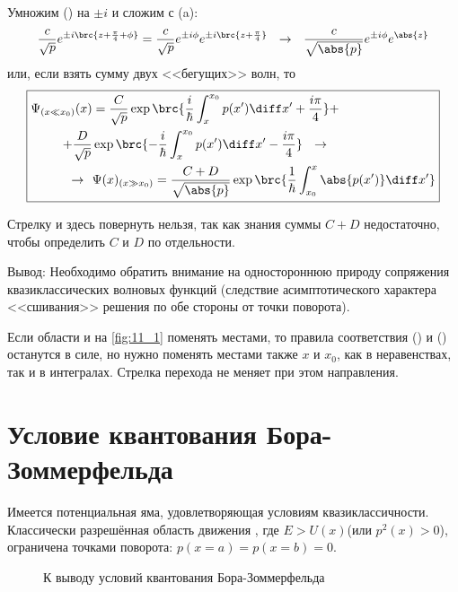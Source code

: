 Умножим () на $\pm i$ и сложим с (a):
$$
\frac{c}{\sqrt{p}} e^{\pm i\brc{z+\frac{\pi}{4}+\phi}} = \frac{c}{\sqrt{p}} e^{\pm i \phi} e^{\pm i\brc{z+\frac{\pi}{4}}} ~~\rightarrow~~
\frac{c}{\sqrt{\abs{p}}} e^{\pm i \phi} e^{\abs{z}}
$$
или, если взять сумму двух <<бегущих>> волн, то
$$
\boxed{
\begin{aligned}
	\Psi_{(x \ll x_0)}(x) &= \frac{C}{\sqrt{p}} \exp\brc{\frac{i}{\hbar} \int_{x}^{x_0} p(x') \diff x' + \frac{i\pi}{4}} 
	+ \\
	+ \frac{D}{\sqrt{p}} &\exp\brc{-\frac{i}{\hbar} \int_{x}^{x_0} p(x') \diff x' - \frac{i\pi}{4}} ~~\rightarrow~~ \\
	~~\rightarrow~~ &\Psi(x)_{(x \gg x_0)} = \frac{C+D}{\sqrt{\abs{p}}} \exp\brc{\frac{1}{\hbar} \int_{x_0}^{x} \abs{p(x')} \diff x'}
\end{aligned}
}
$$

Стрелку и здесь повернуть нельзя, так как знания суммы $C+D$ недостаточно, чтобы определить $C$ и $D$ по отдельности.

Вывод: Необходимо обратить внимание на одностороннюю природу сопряжения квазиклассических волновых функций (следствие асимптотического характера <<сшивания>> решения по обе стороны от точки поворота).

Если области  и  на \autoref{fig:11_1} поменять местами, то правила соответствия () и () останутся в силе, но нужно поменять местами также $x$ и $x_0$, как в неравенствах, так и в интегралах. Стрелка перехода не меняет при этом направления.

\section{Условие квантования Бора-Зоммерфельда}

Имеется потенциальная яма, удовлетворяющая условиям квазиклассичности. Классически разрешённая область движения , где $E > U(x)$(или $p^2(x) > 0$), ограничена точками поворота: $p(x=a) = p(x=b) = 0$.

\begin{figure}[h]
\centering
{}
\caption{К выводу условий квантования Бора-Зоммерфельда} \label{fig:11_4}
\end{figure}

